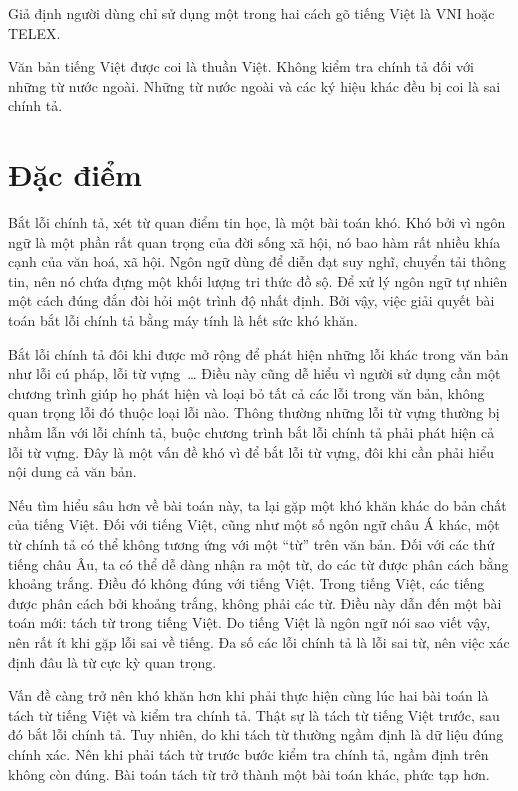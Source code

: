 \documentclass[a4paper,oneside,14pt]{extbook} %
\begin{document}
Giả định người dùng chỉ sử dụng một trong hai cách gõ tiếng Việt là
VNI hoặc TELEX.

Văn bản tiếng Việt được coi là thuần Việt. Không kiểm tra chính tả đối
với những từ nước ngoài. Những từ nước ngoài và các ký hiệu khác đều
bị coi là sai chính tả. 

\section{Đặc điểm}

Bắt lỗi chính tả, xét từ quan điểm tin học, là một bài toán khó. Khó
bởi vì ngôn ngữ là một phần rất quan trọng của đời sống xã hội, nó bao
hàm rất nhiều khía cạnh của văn hoá, xã hội. Ngôn ngữ dùng để diễn đạt
suy nghĩ, chuyển tải thông tin, nên nó chứa đựng một khối lượng tri
thức đồ sộ. Để xử lý ngôn ngữ tự nhiên một cách đúng đắn đòi hỏi một
trình độ nhất định. Bởi vậy, việc giải quyết bài toán bắt lỗi chính tả
bằng máy tính là hết sức khó khăn.

Bắt lỗi chính tả đôi khi được mở rộng để phát hiện những lỗi khác
trong văn bản như lỗi cú pháp, lỗi từ vựng~\ldots{} Điều này cũng dễ
hiểu vì người sử dụng cần một chương trình giúp họ phát hiện và loại
bỏ tất cả các lỗi trong văn bản, không quan trọng lỗi đó thuộc loại
lỗi nào. Thông thường những lỗi từ vựng thường bị nhầm lẫn với lỗi
chính tả, buộc chương trình bắt lỗi chính tả phải phát hiện cả lỗi từ
vựng. Đây là một vấn đề khó vì để bắt lỗi từ vựng, đôi khi cần phải
hiểu nội dung cả văn bản.

Nếu tìm hiểu sâu hơn về bài toán này, ta lại gặp một khó khăn khác do
bản chất của tiếng Việt. Đối với tiếng Việt, cũng như một số
ngôn ngữ châu Á khác, một từ chính tả có thể không tương ứng với một
``từ'' trên văn bản. Đối với các thứ tiếng châu Âu, ta có thể dễ dàng
nhận ra một từ, do các từ được phân cách bằng khoảng trắng. Điều đó
không đúng với tiếng Việt. Trong tiếng Việt, các tiếng được phân cách
bởi khoảng trắng, không phải các từ. Điều này dẫn đến một bài toán
mới: tách từ trong tiếng Việt. Do tiếng Việt là ngôn ngữ nói sao viết
vậy, nên rất ít khi gặp lỗi sai về tiếng. Đa số các lỗi chính tả là
lỗi sai từ, nên việc xác định đâu là từ cực kỳ quan trọng.

Vấn đề càng trở nên khó khăn hơn khi phải thực hiện cùng lúc hai bài
toán là tách từ tiếng Việt và kiểm tra chính tả. Thật sự là tách từ
tiếng Việt trước, sau đó bắt lỗi chính tả. Tuy nhiên, do khi tách từ
thường ngầm định là dữ liệu đúng chính xác. Nên khi phải tách từ trước
bước kiểm tra chính tả, ngầm định trên không còn đúng. Bài toán tách
từ trở thành một bài toán khác, phức tạp hơn.
\end{document}
